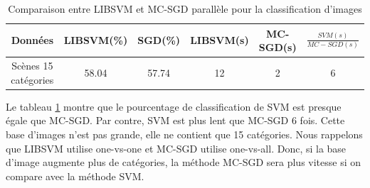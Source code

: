 \pagebreak
\begin{table}
\begin{center}
    \begin{tabular}{ | c | c | c | c | c | c |}
    \hline
    Données & LIBSVM(\%) & SGD(\%) & LIBSVM(s) & MC-SGD(s) & $\frac{SVM(s)}{MC-SGD(s)}$ \\ \hline
    
    Scènes 15 catégories & 58.04 & 57.74 & 12 & 2 & 6 \\ \hline
    
    \end{tabular}
\end{center}
\caption{Comparaison entre LIBSVM et MC-SGD parallèle pour la classification d'images}
\label{tab:pmcsvm-8scenes}
\end{table}

Le tableau \ref{tab:pmcsvm-8scenes} montre que le pourcentage de classification de SVM est presque égale que MC-SGD. Par contre, SVM est plus lent que MC-SGD 6 fois. Cette base d'images n'est pas grande, elle ne contient que 15 catégories. Nous rappelons que LIBSVM utilise one-vs-one et MC-SGD utilise one-vs-all. Donc, si la base d'image augmente plus de catégories, la méthode MC-SGD sera plus vitesse si on compare avec la méthode SVM.




